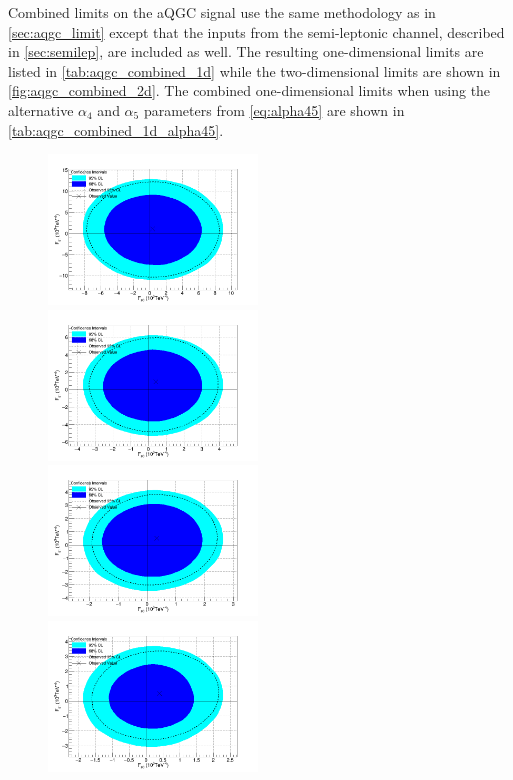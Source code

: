 Combined limits on the aQGC signal use the same methodology
as in \sec\ref{sec:aqgc_limit} except that the inputs from the semi-leptonic
channel, described in \sec\ref{sec:semilep}, are included as well.
The resulting one-dimensional limits are listed in \tab\ref{tab:aqgc_combined_1d}
while the two-dimensional limits are shown in \fig\ref{fig:aqgc_combined_2d}.
The combined one-dimensional limits 
when using the alternative $\alpha_4$ and $\alpha_5$ parameters from \eqn\eqref{eq:alpha45}
are shown in \tab\ref{tab:aqgc_combined_1d_alpha45}.



\begin{figure}[h!]
\begin{center}
\includegraphics[width=0.495\textwidth]{figures/combination/Comb500-Lim.png}
\includegraphics[width=0.495\textwidth]{figures/combination/Comb100-Lim.png}\\
\includegraphics[width=0.495\textwidth]{figures/combination/Comb200-Lim.png}
\includegraphics[width=0.495\textwidth]{figures/combination/Comb300-Lim.png}\\

\end{center}
\end{figure}
